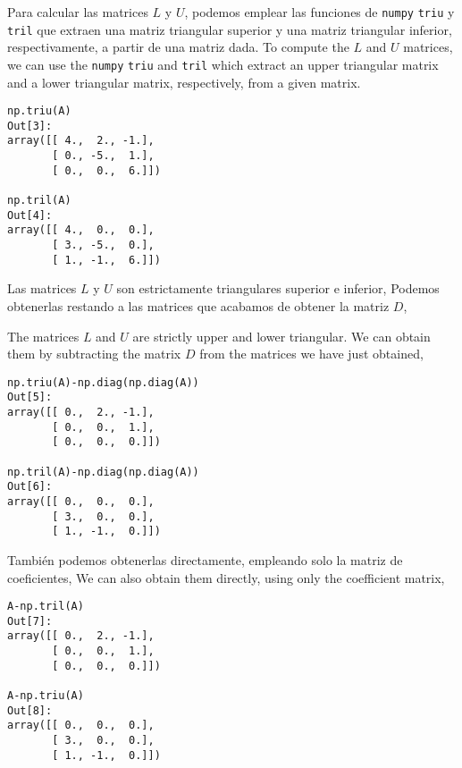 \begin{paracol}{2}
Para calcular las matrices $L$ y $U$, podemos emplear las funciones de \texttt{numpy} \texttt{triu} y \texttt{tril} que extraen una matriz triangular superior y una matriz triangular inferior, respectivamente, a partir de una matriz dada.
\switchcolumn
To compute the $L$ and $U$ matrices, we can use the \texttt{numpy} \texttt{triu} and \texttt{tril} which extract an upper triangular matrix and a lower triangular matrix, respectively, from a given matrix.
\end{paracol}
\begin{verbatim}
np.triu(A)
Out[3]: 
array([[ 4.,  2., -1.],
       [ 0., -5.,  1.],
       [ 0.,  0.,  6.]])

np.tril(A)
Out[4]: 
array([[ 4.,  0.,  0.],
       [ 3., -5.,  0.],
       [ 1., -1.,  6.]])
\end{verbatim}
\begin{paracol}{2}
    
Las matrices $L$ y $U$ son estrictamente triangulares superior e inferior, Podemos obtenerlas restando a las matrices que acabamos de obtener la matriz $D$,
\switchcolumn

The matrices $L$ and $U$ are strictly upper and lower triangular. We can obtain them by subtracting the matrix $D$ from the matrices we have just obtained,

\end{paracol}
\begin{verbatim}
np.triu(A)-np.diag(np.diag(A))
Out[5]: 
array([[ 0.,  2., -1.],
       [ 0.,  0.,  1.],
       [ 0.,  0.,  0.]])

np.tril(A)-np.diag(np.diag(A))
Out[6]: 
array([[ 0.,  0.,  0.],
       [ 3.,  0.,  0.],
       [ 1., -1.,  0.]])
\end{verbatim}

\begin{paracol}{2}
También podemos obtenerlas directamente, empleando solo la matriz de coeficientes,
\switchcolumn
We can also obtain them directly, using only the coefficient matrix,
\end{paracol}

\begin{verbatim}
A-np.tril(A)
Out[7]: 
array([[ 0.,  2., -1.],
       [ 0.,  0.,  1.],
       [ 0.,  0.,  0.]])

A-np.triu(A)
Out[8]: 
array([[ 0.,  0.,  0.],
       [ 3.,  0.,  0.],
       [ 1., -1.,  0.]])
\end{verbatim}

